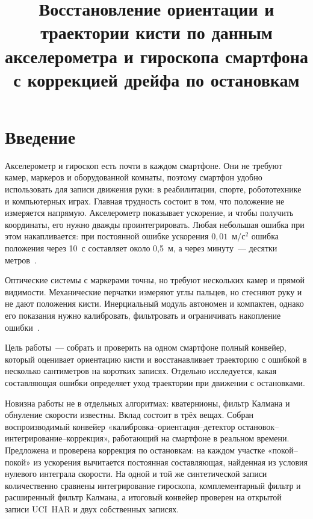 \documentclass{misisarticle}
\title{Восстановление ориентации и траектории кисти по данным акселерометра и гироскопа смартфона с коррекцией дрейфа по остановкам}
\begin{document}
\maketitle

\section{Введение}

Акселерометр и гироскоп есть почти в каждом смартфоне. Они не требуют камер, маркеров и оборудованной комнаты, поэтому смартфон удобно использовать для записи движения руки: в реабилитации, спорте, робототехнике и компьютерных играх. Главная трудность состоит в том, что положение не измеряется напрямую. Акселерометр показывает ускорение, и чтобы получить координаты, его нужно дважды проинтегрировать. Любая небольшая ошибка при этом накапливается: при постоянной ошибке ускорения $0{,}01$~м/с$^2$ ошибка положения через 10~с составляет около 0,5~м, а через минуту~--- десятки метров~\cite{woodman}.

Оптические системы с маркерами точны, но требуют нескольких камер и прямой видимости. Механические перчатки измеряют углы пальцев, но стесняют руку и не дают положения кисти. Инерциальный модуль автономен и компактен, однако его показания нужно калибровать, фильтровать и ограничивать накопление ошибки~\cite{kortier,shenoy}.

Цель работы~--- собрать и проверить на одном смартфоне полный конвейер, который оценивает ориентацию кисти и восстанавливает траекторию с ошибкой в несколько сантиметров на коротких записях. Отдельно исследуется, какая составляющая ошибки определяет уход траектории при движении с остановками.

Новизна работы не в отдельных алгоритмах: кватернионы, фильтр Калмана и обнуление скорости известны. Вклад состоит в трёх вещах. Собран воспроизводимый конвейер «калибровка--ориентация--детектор остановок--интегрирование--коррекция», работающий на смартфоне в реальном времени. Предложена и проверена коррекция по остановкам: на каждом участке «покой--покой» из ускорения вычитается постоянная составляющая, найденная из условия нулевого интеграла скорости. На одной и той же синтетической записи количественно сравнены интегрирование гироскопа, комплементарный фильтр и расширенный фильтр Калмана, а итоговый конвейер проверен на открытой записи UCI~HAR и двух собственных записях.

\end{document}
